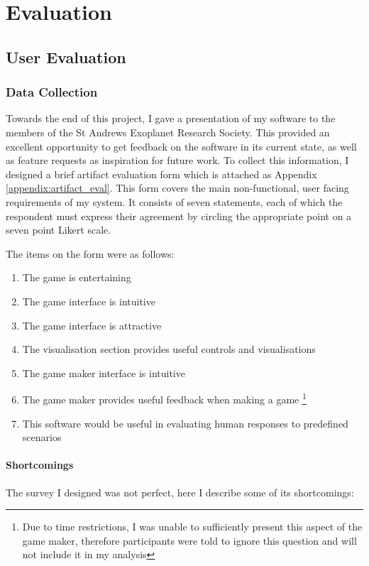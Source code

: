 \chapter{Evaluation}

\section{User Evaluation}

\subsection{Data Collection}
Towards the end of this project, I gave a presentation of my software to the members \cite{CfESMembers} of the St Andrews Exoplanet Research Society. This provided an excellent opportunity to get feedback on the software in its current state, as well as feature requests as inspiration for future work. To collect this information, I designed a brief artifact evaluation form which is attached as Appendix \ref{appendix:artifact_eval}. This form covers the main non-functional, user facing requirements of my system. It consists of seven statements, each of which the respondent must express their agreement by circling the appropriate point on a seven point Likert scale.

The items on the form were as follows:
\begin{enumerate}[label=\textbf{it.\arabic*}]
    \item\label{i:gent} The game is entertaining
    \item\label{i:gint} The game interface is intuitive
    \item\label{i:gatt} The game interface is attractive
    \item\label{i:vis} The visualisation section provides useful controls and visualisations
    \item\label{i:gmint} The game maker interface is intuitive
    \item\label{i:gmuse} The game maker provides useful feedback when making a game \footnote{Due to time restrictions, I was unable to sufficiently present this aspect of the game maker, therefore participants were told to ignore this question and will not include it in my analysis}
    \item\label{i:s} This software would be useful in evaluating human responses to predefined scenarios
\end{enumerate}

\subsubsection{Shortcomings}
The survey I designed was not perfect, here I describe some of its shortcomings:

